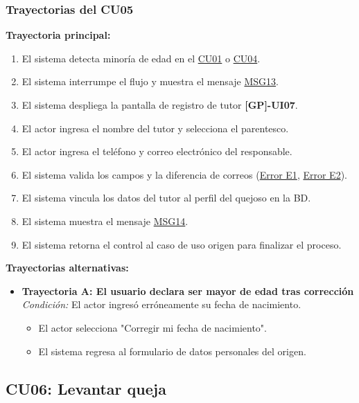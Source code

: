 \begin{appendices}
\subsubsection{Trayectorias del CU05}

\textbf{Trayectoria principal:}
\begin{enumerate}[nosep]
    \item El sistema detecta minoría de edad en el \hyperlink{anexo:casos_uso}{CU01} o \hyperlink{anexo:casos_uso}{CU04}.
    \item El sistema interrumpe el flujo y muestra el mensaje \hyperlink{msg:MSG13}{MSG13}.
    \item El sistema despliega la pantalla de registro de tutor \textbf{[GP]-UI07}.
    \item El actor ingresa el nombre del tutor y selecciona el parentesco.
    \item El actor ingresa el teléfono y correo electrónico del responsable.
    \item El sistema valida los campos y la diferencia de correos (\hyperlink{err:E8}{Error E1}, \hyperlink{err:E9}{Error E2}).
    \item El sistema vincula los datos del tutor al perfil del quejoso en la BD.
    \item El sistema muestra el mensaje \hyperlink{msg:MSG14}{MSG14}.
    \item El sistema retorna el control al caso de uso origen para finalizar el proceso.
\end{enumerate}

\textbf{Trayectorias alternativas:}
\begin{itemize}[leftmargin=*]
    \item \textbf{Trayectoria A: El usuario declara ser mayor de edad tras corrección} \\
    \textit{Condición:} El actor ingresó erróneamente su fecha de nacimiento.
    \begin{itemize}[nosep]
        \item[A-1:] El actor selecciona "Corregir mi fecha de nacimiento".
        \item[A-2:] El sistema regresa al formulario de datos personales del origen.
    \end{itemize}
\end{itemize}

\subsection{CU06: Levantar queja}


\end{appendices}
